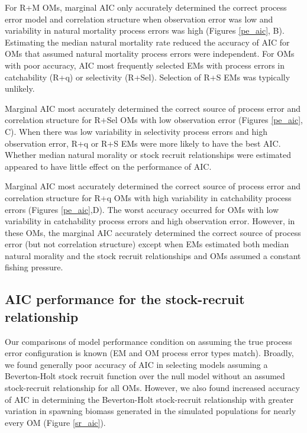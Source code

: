 \documentclass[
  12pt,
]{article}
\begin{document}
For R+M OMs, marginal AIC only accurately determined the correct process
error model and correlation structure when observation error was low and
variability in natural mortality process errors was high (Figures
\ref{pe_aic}, B). Estimating the median natural mortality rate reduced
the accuracy of AIC for OMs that assumed natural mortality process
errors were independent. For OMs with poor accuracy, AIC most frequently
selected EMs with process errors in catchability (R+q) or selectivity
(R+Sel). Selection of R+S EMs was typically unlikely.

Marginal AIC most accurately determined the correct source of process
error and correlation structure for R+Sel OMs with low observation error
(Figures \ref{pe_aic}, C). When there was low variability in selectivity
process errors and high observation error, R+q or R+S EMs were more
likely to have the best AIC. Whether median natural morality or stock
recruit relationships were estimated appeared to have little effect on
the performance of AIC.

Marginal AIC most accurately determined the correct source of process
error and correlation structure for R+q OMs with high variability in
catchability process errors (Figures \ref{pe_aic},D). The worst accuracy
occurred for OMs with low variability in catchability process errors and
high observation error. However, in these OMs, the marginal AIC
accurately determined the correct source of process error (but not
correlation structure) except when EMs estimated both median natural
morality and the stock recruit relationships and OMs assumed a constant
fishing pressure.

\hypertarget{aic-performance-for-the-stock-recruit-relationship}{%
\subsection*{AIC performance for the stock-recruit
relationship}\label{aic-performance-for-the-stock-recruit-relationship}}

Our comparisons of model performance condition on assuming the true
process error configuration is known (EM and OM process error types
match). Broadly, we found generally poor accuracy of AIC in selecting
models assuming a Beverton-Holt stock recruit function over the null
model without an assumed stock-recruit relationship for all OMs.
However, we also found increased accuracy of AIC in determining the
Beverton-Holt stock-recruit relationship with greater variation in
spawning biomass generated in the simulated populations for nearly every
OM (Figure \ref{sr_aic}).
\end{document}
